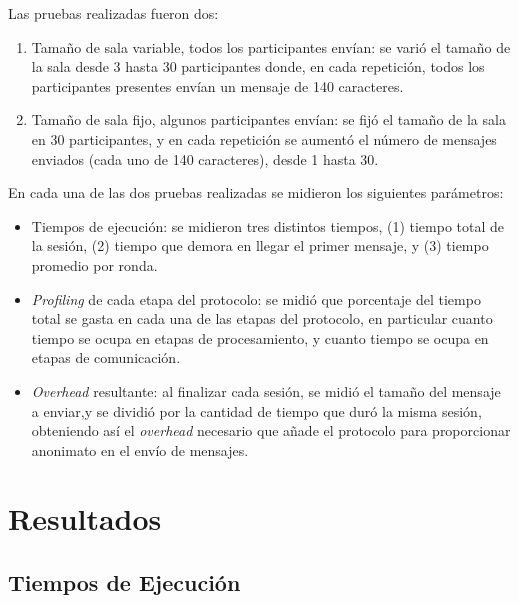 Las pruebas realizadas fueron dos:

\begin{enumerate}
	\item Tamaño de sala variable, todos los participantes envían: se 
	varió el tamaño de la sala desde 3 hasta 30 participantes donde, en 
	cada repetición, todos los participantes presentes envían un 
	mensaje de 140 caracteres.
	\item Tamaño de sala fijo, algunos participantes envían: se fijó 
	el tamaño de la sala en 30 participantes, y en cada repetición se 
	aumentó el número de mensajes enviados (cada uno de 140 caracteres), 
	desde 1 hasta 30.
\end{enumerate}

En cada una de las dos pruebas realizadas se midieron los siguientes 
parámetros:

\begin{itemize}
	\item Tiempos de ejecución: se midieron tres distintos tiempos, (1) tiempo 
	total de la sesión, (2) tiempo que demora en llegar el primer mensaje, y 
	(3) tiempo promedio por ronda.
	\item \emph{Profiling} de cada etapa del protocolo: se midió que 
	porcentaje del tiempo total se gasta en cada una de las etapas del 
	protocolo, en particular cuanto tiempo se ocupa en etapas de 
	procesamiento, y cuanto tiempo se ocupa en etapas de comunicación.
	\item \emph{Overhead} resultante: al finalizar cada sesión, se midió el 
	tamaño del mensaje a enviar,y se dividió por la cantidad de tiempo que 
	duró la misma sesión, obteniendo así el \emph{overhead} necesario que añade
	el protocolo para proporcionar anonimato en el envío de mensajes.
\end{itemize}

\section{Resultados}

\subsection{Tiempos de Ejecución}

